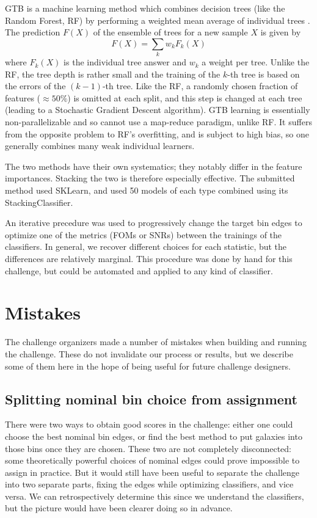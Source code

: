 \documentclass[twocolumn,twocolappendix]{aastex63}
\begin{document}
GTB is a machine learning method which combines decision trees (like the Random Forest, RF)
by performing a weighted mean average of individual trees \citep{Friedman:2002we,RefWorks:1634}. 
The prediction $F(X)$ of the ensemble of trees for a new sample $X$ is given by
\begin{equation}
F(X) = \sum_k w_k F_k(X)
\end{equation}
where $F_k(X)$ is the individual tree answer and $w_k$ a weight per tree. Unlike the RF, the 
tree depth is rather small and the training  of the $k$-th tree is based on the errors of the
$(k-1)$-th tree.  Like the RF, a randomly chosen fraction of features ($\approx 50\%$) is 
omitted at each split, and this step is changed at each tree (leading to a Stochastic Gradient Descent 
algorithm).  GTB learning is essentially non-parallelizable and so cannot use a map-reduce paradigm, 
unlike RF. It suffers from the opposite problem to RF's overfitting, and is subject
to high bias, so one generally combines many weak individual learners.

The two methods have their own systematics; they notably differ in the feature importances. Stacking 
the two is therefore especially effective.  The submitted method used {\sc SKLearn}, and used 50 models 
of each type combined using its {\sc StackingClassifier}.

An iterative precedure was used to progressively change the target bin edges to optimize one of the metrics (FOMs or SNRs) between the trainings of the classifiers. In general, we recover different choices for each statistic, but the differences are relatively marginal. This procedure was done by hand for this challenge, but could be automated and applied to any kind of classifier.



\section{Mistakes} \label{sec:mistakes}
The challenge organizers made a number of mistakes when building and running the challenge.
These do not invalidate our process or results, but we describe some of them here in the hope of
being useful for future challenge designers.

\subsection{Splitting nominal bin choice from assignment}
There were two ways to obtain good scores in the challenge: either one could choose the best
nominal bin edges, or find the best method to put galaxies into those bins once they are chosen.
These two are not completely disconnected: some theoretically powerful choices of nominal edges
could prove impossible to assign in practice.  But it would still have been useful to separate
the challenge into two separate parts, fixing the edges while optimizing classifiers, and vice
versa.   We can retrospectively determine this since we understand the classifiers, but the picture
would have been clearer doing so in advance.
\end{document}
